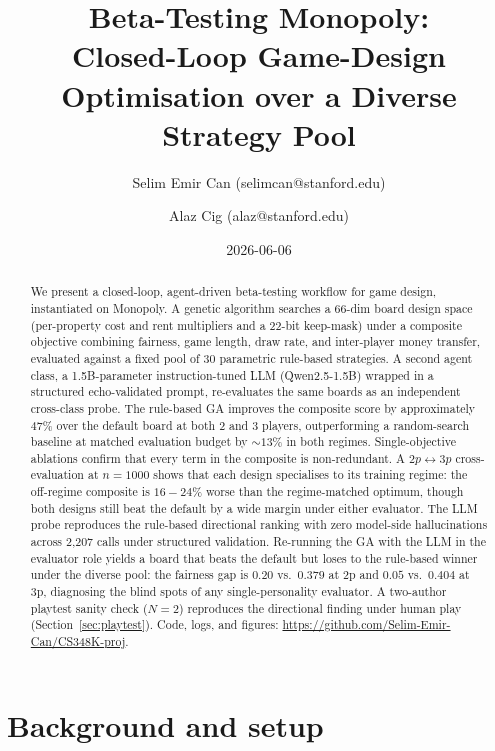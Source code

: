 \documentclass[10pt]{article}
\title{Beta-Testing Monopoly: \\Closed-Loop Game-Design Optimisation
       over a Diverse Strategy Pool}
\author{Selim Emir Can (selimcan@stanford.edu) \and Alaz Cig (alaz@stanford.edu)}
\date{2026-06-06}
\begin{document}
\maketitle

\begin{abstract}
We present a closed-loop, agent-driven beta-testing workflow for game
design, instantiated on Monopoly. A genetic algorithm searches a 66-dim
board design space (per-property cost and rent multipliers and a 22-bit
keep-mask) under a composite objective combining fairness, game length,
draw rate, and inter-player money transfer, evaluated against a fixed
pool of 30 parametric rule-based strategies. A second agent class, a
1.5B-parameter instruction-tuned LLM (Qwen2.5-1.5B) wrapped in a
structured echo-validated prompt, re-evaluates the same boards as an
independent cross-class probe. The rule-based GA improves the composite
score by approximately $47\%$ over the default board at both 2 and
3 players, outperforming a random-search baseline at matched
evaluation budget by $\sim 13\%$ in both regimes. Single-objective ablations confirm that every term in the
composite is non-redundant. A $2p\!\leftrightarrow\!3p$
cross-evaluation at $n{=}1000$ shows that each design specialises
to its training regime: the off-regime composite is $16\!-\!24\%$
worse than the regime-matched optimum, though both designs still
beat the default by a wide margin under either evaluator.
The LLM probe reproduces the rule-based directional ranking with zero
model-side hallucinations across 2{,}207 calls under structured
validation. Re-running the GA with the LLM in the evaluator role yields
a board that beats the default but loses to the rule-based winner under
the diverse pool: the fairness gap is $0.20$ vs.\ $0.379$ at 2p and
$0.05$ vs.\ $0.404$ at 3p, diagnosing the blind spots of any
single-personality evaluator. A two-author playtest sanity check
($N{=}2$) reproduces the directional finding under human play
(Section~\ref{sec:playtest}). Code, logs, and figures:
\url{https://github.com/Selim-Emir-Can/CS348K-proj}.
\end{abstract}

\section{Background and setup}\label{sec:bg}
\end{document}
